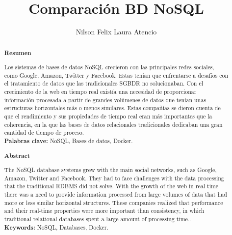\documentclass[%
 reprint,
 amsmath,amssymb,
 aps,
]{revtex4-1}
\begin{document}
\title{Comparación BD NoSQL}
\author{Nilson Felix Laura Atencio}
%


\begin{abstract}
\begin{center}
\textbf{Resumen}
\end{center}

Los sistemas de bases de datos NoSQL crecieron con las principales redes sociales, como Google, Amazon, Twitter y Facebook. Estas tenían que enfrentarse a desafíos con el tratamiento de datos que las tradicionales SGBDR no solucionaban. Con el crecimiento de la web en tiempo real existía una necesidad de proporcionar información procesada a partir de grandes volúmenes de datos que tenían unas estructuras horizontales más o menos similares. Estas compañías se dieron cuenta de que el rendimiento y sus propiedades de tiempo real eran más importantes que la coherencia, en la que las bases de datos relacionales tradicionales dedicaban una gran cantidad de tiempo de proceso.\\

\textbf{Palabras clave:}   NoSQL, Bases de datos, Docker.\\

\begin{center}
\textbf{Abstract}
\end{center}
The NoSQL database systems grew with the main social networks, such as Google, Amazon, Twitter and Facebook. They had to face challenges with the data processing that the traditional RDBMS did not solve. With the growth of the web in real time there was a need to provide information processed from large volumes of data that had more or less similar horizontal structures. These companies realized that performance and their real-time properties were more important than consistency, in which traditional relational databases spent a large amount of processing time..\\
\textbf{Keywords:}  NoSQL, Databases, Docker.\\

\end{abstract}



\maketitle

\end{document}
